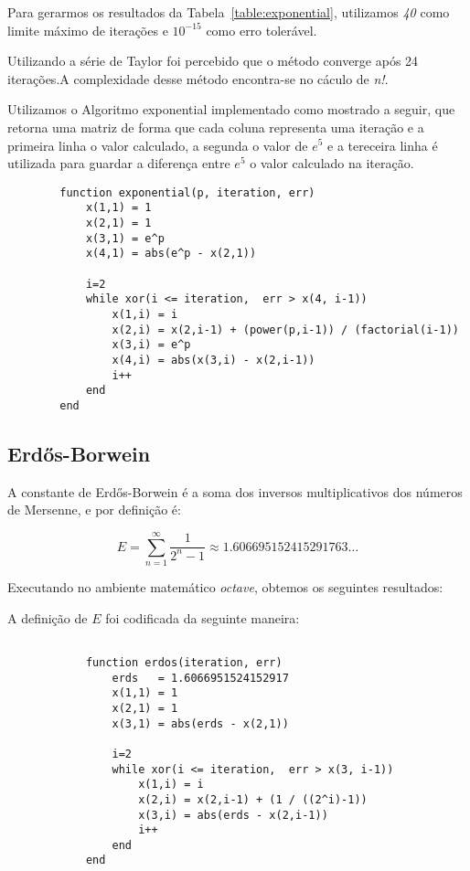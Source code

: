 		Para gerarmos os resultados da Tabela~\ref{table:exponential},
		utilizamos \emph{40} como limite máximo de iterações e $10^{-15}$ como erro
		tolerável.

		

		Utilizando a série de Taylor foi percebido que o método converge após 24
		iterações.A complexidade desse método encontra-se no cáculo de
		\emph{n!}.

		Utilizamos o Algoritmo exponential implementado como mostrado a seguir,
		que retorna uma matriz de forma que cada coluna representa uma iteração
		e a primeira linha o valor calculado, a segunda o valor de $e^5$ e a
		tereceira linha é utilizada para guardar a diferença entre $e^5$ o valor
		calculado na iteração.

		\begin{lstlisting}
		function exponential(p, iteration, err)
			x(1,1) = 1
			x(2,1) = 1
			x(3,1) = e^p
			x(4,1) = abs(e^p - x(2,1))

			i=2
			while xor(i <= iteration,  err > x(4, i-1))
				x(1,i) = i
				x(2,i) = x(2,i-1) + (power(p,i-1)) / (factorial(i-1))
				x(3,i) = e^p
				x(4,i) = abs(x(3,i) - x(2,i-1))
				i++
			end
		end
		\end{lstlisting}

	\subsection{Erdős-Borwein}

		A constante de Erdős-Borwein é a soma dos inversos multiplicativos dos
		números de Mersenne, e por definição é:

		\begin{equation}
			E = \displaystyle\sum_{n=1}^{\infty} \frac{1}{2^n-1} \approx 1.606695152415291763\dots
		\end{equation}

		Executando no ambiente matemático \emph{octave}, obtemos os seguintes
		resultados:

		

		A definição de $E$ foi codificada da seguinte maneira:

		\begin{lstlisting}

			function erdos(iteration, err)
				erds   = 1.6066951524152917
				x(1,1) = 1
				x(2,1) = 1
				x(3,1) = abs(erds - x(2,1))

				i=2
				while xor(i <= iteration,  err > x(3, i-1))
					x(1,i) = i
					x(2,i) = x(2,i-1) + (1 / ((2^i)-1))
					x(3,i) = abs(erds - x(2,i-1))
					i++
				end
			end

		\end{lstlisting}

